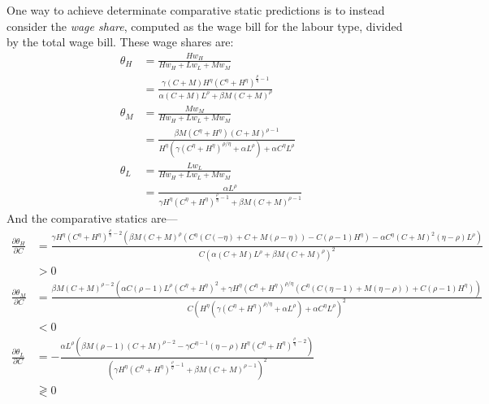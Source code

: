 One way to achieve determinate comparative static predictions is to instead consider the {\em wage share}, computed as the wage bill for the labour type, divided by the total wage bill. These wage shares are:
\begin{align*}
\theta_H &= \frac{H w_H}{H w_H+L w_L+M w_M} \\
&= \frac{\gamma  (C+M) H^{\eta } \left(C^{\eta }+H^{\eta }\right)^{\frac{\rho }{\eta }-1}}{\alpha  (C+M) L^{\rho }+\beta  M (C+M)^{\rho }} \\
\theta_M &= \frac{M w_M}{H w_H+L w_L+M w_M} \\
&= \frac{\beta  M \left(C^{\eta }+H^{\eta }\right) (C+M)^{\rho -1}}{H^{\eta } \left(\gamma  \left(C^{\eta }+H^{\eta }\right)^{\rho /\eta }+\alpha  L^{\rho }\right)+\alpha  C^{\eta } L^{\rho }} \\
\theta_L &= \frac{L w_L}{H w_H+L w_L+M w_M} \\
&= \frac{\alpha  L^{\rho }}{\gamma  H^{\eta } \left(C^{\eta }+H^{\eta }\right)^{\frac{\rho }{\eta }-1}+\beta  M (C+M)^{\rho -1}}
\end{align*}
And the comparative statics are---
\begin{align*}
\frac{\partial \theta_H}{\partial C}
&= \frac{\gamma  H^{\eta } \left(C^{\eta }+H^{\eta }\right)^{\frac{\rho }{\eta }-2} \left(\beta  M (C+M)^{\rho } \left(C^{\eta } (C (-\eta )+C+M (\rho -\eta ))-C (\rho -1) H^{\eta }\right)-\alpha  C^{\eta } (C+M)^2 (\eta -\rho ) L^{\rho }\right)}{C \left(\alpha  (C+M) L^{\rho }+\beta  M (C+M)^{\rho }\right)^2} \\
&>0 \\
%
\frac{\partial \theta_M}{\partial C}
&= \frac{\beta  M (C+M)^{\rho -2} \left(\alpha  C (\rho -1) L^{\rho } \left(C^{\eta }+H^{\eta }\right)^2+\gamma  H^{\eta } \left(C^{\eta }+H^{\eta }\right)^{\rho /\eta } \left(C^{\eta } (C (\eta -1)+M (\eta -\rho ))+C (\rho -1) H^{\eta }\right)\right)}{C \left(H^{\eta } \left(\gamma  \left(C^{\eta }+H^{\eta }\right)^{\rho /\eta }+\alpha  L^{\rho }\right)+\alpha  C^{\eta } L^{\rho }\right)^2} \\
& < 0 \\
%
\frac{\partial \theta_L}{\partial C}
&= -\frac{\alpha  L^{\rho } \left(\beta  M (\rho -1) (C+M)^{\rho -2}-\gamma  C^{\eta -1} (\eta -\rho ) H^{\eta } \left(C^{\eta }+H^{\eta }\right)^{\frac{\rho }{\eta }-2}\right)}{\left(\gamma  H^{\eta } \left(C^{\eta }+H^{\eta }\right)^{\frac{\rho }{\eta }-1}+\beta  M (C+M)^{\rho -1}\right)^2} \\
& \gtrless 0
\end{align*}

